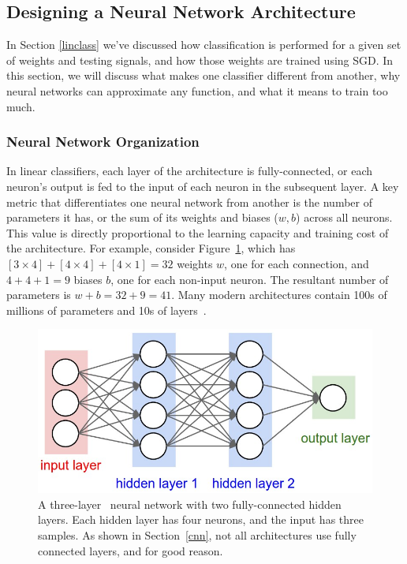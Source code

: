 \subsection{Designing a Neural Network Architecture}
\label{NNdesign}
In Section \ref{linclass} we've discussed how classification is performed for a given set of weights and testing signals, and how those weights are trained using SGD. In this section, we will discuss what makes one classifier different from another, why neural networks can approximate any function, and what it means to train too much.
\subsubsection{Neural Network Organization}
In linear classifiers, each layer of the architecture is fully-connected, or each neuron's output is fed to the input of each neuron in the subsequent layer. A key metric that differentiates one neural network from another is the number of parameters it has, or the sum of its weights and biases ($w,b$) across all neurons. This value is directly proportional to the learning capacity and training cost of the architecture. For example, consider Figure~\ref{fig:threelayernn}, which has $[3\times 4] + [4 \times 4] + [4 \times 1] = 32$ weights $w$, one for each connection, and $4 + 4+ 1 = 9$ biases $b$, one for each non-input neuron. The resultant number of parameters is $w+b=32+9=41$. Many modern architectures contain 100s of millions of parameters and 10s of layers~\cite{cs231}.
\begin{figure}[ht!]
	\centering	\includegraphics[width=1\textwidth,keepaspectratio]{figs/neural_net.jpeg}
    \caption{A three-layer~\cite{cs231} neural network with two fully-connected hidden layers. Each hidden layer has four neurons, and the input has three samples. As shown in Section~\ref{cnn}, not all architectures use fully connected layers, and for good reason.}
\label{fig:threelayernn}      
\end{figure}

